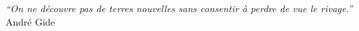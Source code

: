 \cleardoublepage
\thispagestyle{plain}

\vspace*{8cm}

\begin{flushright}
   \textsl{``On ne découvre pas de terres nouvelles sans consentir à perdre de vue le rivage.''} \\
\vspace*{1.5cm}
        André Gide
\end{flushright}

